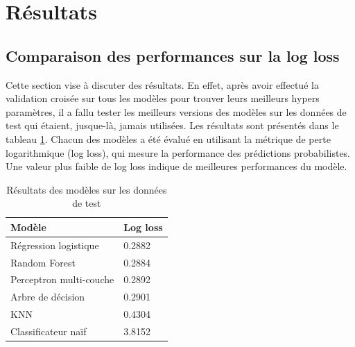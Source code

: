\documentclass[12pt]{article}
\begin{document}
\newpage
\section{Résultats}
\label{sec:results}
\subsection{Comparaison des performances sur la log loss}
Cette section vise à discuter des résultats.
En effet, après avoir effectué la validation croisée sur tous les modèles pour trouver leurs meilleurs hypers paramètres, il a fallu tester les meilleurs versions des modèles sur les données de test qui étaient, jusque-là, jamais utilisées.
Les résultats sont présentés dans le tableau \ref{tab:results}.
Chacun des modèles a été évalué en utilisant la métrique de perte logarithmique (log loss), qui mesure la performance des prédictions probabilistes. 
Une valeur plus faible de log loss indique de meilleures performances du modèle.

\begin{table}[htp]
    \centering
    \begin{tabular}{|l|l|}
    \hline
    \textbf{Modèle}          & \textbf{Log loss} \\ \hline
    Régression logistique    & 0.2882          \\ \hline
    Random Forest            & 0.2884          \\ \hline
    Perceptron multi-couche & 0.2892          \\ \hline
    Arbre de décision        & 0.2901         \\ \hline
    KNN                      & 0.4304         \\ \hline
    Classificateur naïf      & 3.8152          \\ \hline
    \end{tabular}
    \caption{Résultats des modèles sur les données de test}
    \label{tab:results}
\end{table}
\end{document}
